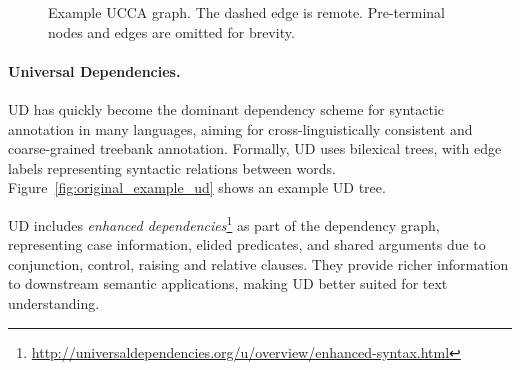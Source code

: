 \documentclass[11pt,a4paper]{article}
\begin{document}
\begin{figure}[!ht]
  \centering
\caption{\label{fig:example_ucca}
 Example UCCA graph. The dashed edge is remote.
  Pre-terminal nodes and edges are omitted for brevity.}
\end{figure}

\paragraph{Universal Dependencies.}\label{sec:ud}
UD \cite{nivre2016universal} has quickly become
the dominant dependency scheme for
syntactic  annotation in many languages,
aiming for cross-linguistically consistent and coarse-grained treebank
annotation. Formally, UD uses bilexical trees, with edge labels 
representing syntactic relations between words.
Figure~\ref{fig:original_example_ud} shows an example UD tree.

UD includes \textit{enhanced dependencies}\footnote{\url{http://universaldependencies.org/u/overview/enhanced-syntax.html}}
as part of the dependency graph, representing
case information, elided predicates,
and shared arguments due to conjunction, control, raising and relative clauses.
They provide richer information to downstream semantic applications,
making UD better suited for text understanding.
\end{document}
